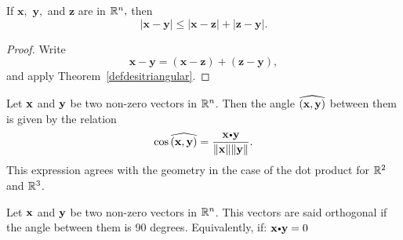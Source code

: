 \begin{corollary}\label{defdesitriangular2}
 If $\mathbf{x},$ $\mathbf{y},$ and
$\mathbf{z}$ are  in $\mathbb{R}^n,$ then
$$
|\mathbf{x}-\mathbf{y}|\le
|\mathbf{x}-\mathbf{z}|+|\mathbf{z}-\mathbf{y}|.
$$
\end{corollary}

\begin{proof} Write
$$
\mathbf{x}-\mathbf{y}=(\mathbf{x}-\mathbf{z})+(\mathbf{z}-\mathbf{y}),
$$
and apply Theorem~\ref{defdesitriangular}.
\end{proof}



\begin{df}
Let $\mathbf{ x}$ and $\mathbf{ y}$ be two non-zero vectors  in $\mathbb{R}^n$. Then the angle
$\widehat{(\mathbf{ x}, \mathbf{ y})}$ between them is given by the relation $$\cos
\anglebetween{x}{y} =
\dfrac{\dotprod{x}{y}}{\norm{\vector{x}}\norm{\vector{y}}}.
$$This expression agrees with the geometry in the case of the dot
product for $\mathbb{R}^2$ and $\mathbb{R}^3$.
\end{df}



\begin{df}
 Let $\mathbf{ x}$ and $\mathbf{ y}$ be two non-zero vectors  in $\mathbb{R}^n$. This vectors  are said  orthogonal if the angle between them is 90 degrees.  Equivalently, if:
 $\vector{x} \bp \vector{y}=0$ 
\end{df}









